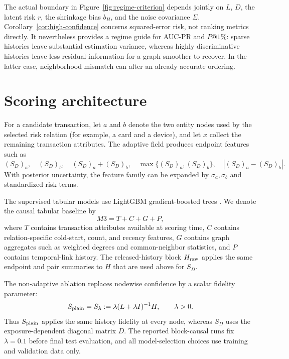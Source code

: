 \documentclass[11pt]{article}
\theoremstyle{definition}
\theoremstyle{remark}
\newcommand{\SD}{S_D}
\begin{document}
The actual boundary in Figure~\ref{fig:regime-criterion} depends jointly on $L$, $D$, the latent risk $r$, the shrinkage bias $b_H$, and the noise covariance $\Sigma$. Corollary~\ref{cor:high-confidence} concerns squared-error risk, not ranking metrics directly. It nevertheless provides a regime guide for AUC-PR and $P@1\%$: sparse histories leave substantial estimation variance, whereas highly discriminative histories leave less residual information for a graph smoother to recover. In the latter case, neighborhood mismatch can alter an already accurate ordering.

\section{Scoring architecture}
\label{sec:architecture}

For a candidate transaction, let $a$ and $b$ denote the two entity nodes used by the selected risk relation (for example, a card and a device), and let $x$ collect the remaining transaction attributes. The adaptive field produces endpoint features such as
\[
    (\SD)_a,
    \quad
    (\SD)_b,
    \quad
    (\SD)_a+(\SD)_b,
    \quad
    \max\{(\SD)_a,(\SD)_b\},
    \quad
    |(\SD)_a-(\SD)_b|.
\]
With posterior uncertainty, the feature family can be expanded by $\sigma_a,\sigma_b$ and standardized risk terms.

The supervised tabular models use LightGBM gradient-boosted trees \cite{ke2017lightgbm}. We denote the causal tabular baseline by
\[
    M3=T+C+G+P,
\]
where $T$ contains transaction attributes available at scoring time, $C$ contains relation-specific cold-start, count, and recency features, $G$ contains graph aggregates such as weighted degrees and common-neighbor statistics, and $P$ contains temporal-link history. The released-history block $H_{\rm raw}$ applies the same endpoint and pair summaries to $H$ that are used above for $S_D$.

The non-adaptive ablation replaces nodewise confidence by a scalar fidelity parameter:
\[
    S_{\rm plain}=S_{\lambda}:=\lambda(L+\lambda I)^{-1}H,
    \qquad \lambda>0.
\]
Thus $S_{\rm plain}$ applies the same history fidelity at every node, whereas $S_D$ uses the exposure-dependent diagonal matrix $D$. The reported block-causal runs fix $\lambda=0.1$ before final test evaluation, and all model-selection choices use training and validation data only.
\end{document}
